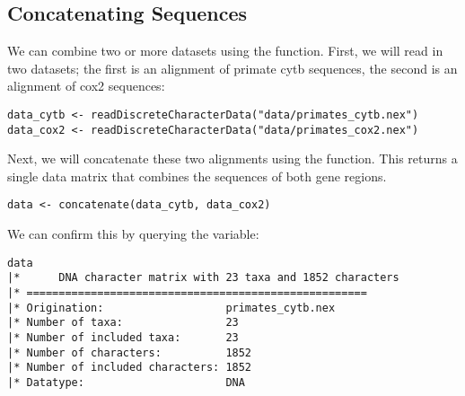 %


\subsection{Concatenating Sequences}
We can combine two or more datasets using the  function.
First, we will read in two datasets; the first is an alignment of primate cytb sequences, the second is an alignment of cox2 sequences:

{\tt \begin{snugshade*}
\begin{lstlisting}
data_cytb <- readDiscreteCharacterData("data/primates_cytb.nex")
data_cox2 <- readDiscreteCharacterData("data/primates_cox2.nex")
\end{lstlisting}
\end{snugshade*}}

Next, we will concatenate these two alignments using the  function. 
This returns a single data matrix that combines the sequences of both gene regions.

{\tt \begin{snugshade*}
\begin{lstlisting}
data <- concatenate(data_cytb, data_cox2)
\end{lstlisting}
\end{snugshade*}}

We can confirm this by querying the  variable: 

{\tt \begin{snugshade*}
\begin{lstlisting}
data
|*      DNA character matrix with 23 taxa and 1852 characters
|* =====================================================
|* Origination:                   primates_cytb.nex
|* Number of taxa:                23
|* Number of included taxa:       23
|* Number of characters:          1852
|* Number of included characters: 1852
|* Datatype:                      DNA
\end{lstlisting}
\end{snugshade*}}


